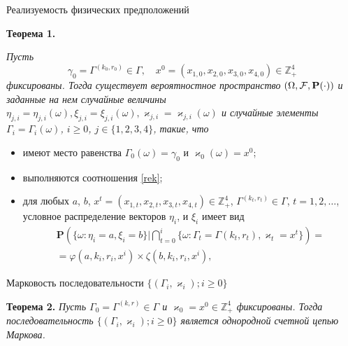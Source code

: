 \documentclass[10pt]{beamer}
\begin{document}
\begin{frame}{Реализуемость физических предположений}
  \begin{block}
    {\bf Теорема 1.} {\it 
    Пусть 
    $$\gamma_0=\Gamma^{(k_0,r_0)} \in \Gamma, \quad x^0=(x_{1,0},x_{2,0}, x_{3,0},x_{4,0})\in \mathbb{Z}_+^4$$ фиксированы. Тогда существует вероятностное пространство $(\Omega, {\cal F}, {\mathbf P}(\cdot))$ и заданные на нем случайные величины $\eta_{j,i}=\eta_{j,i}(\omega), \xi_{j,i}=\xi_{j,i}(\omega), \varkappa_{j,i}=\varkappa_{j,i}(\omega)$ и случайные элементы $\Gamma_i=\Gamma_i(\omega)$, $i\geqslant 0$, $j\in \{1, 2, 3, 4\}$, такие, что 
    \begin{itemize}
    \item имеют место равенства $\Gamma_0(\omega) = \gamma_0$ и $\varkappa_0(\omega)=x^0$;
    \item выполняются соотношения \eqref{rek};
    \item для любых  $a$, $b$, $x^t=(x_{1,t},x_{2,t},x_{3,t},x_{4,t}) \in \mathbb{Z}_+^4$, $\Gamma^{(k_t,r_t)} \in \Gamma$, $t = 1, 2, \ldots$, условное распределение векторов $\eta_i$, и $\xi_i$ имеет вид 
\begin{multline*}
    {\mathbf P}(\{ \omega \colon \eta_i = a, \xi_i=b\} |\bigcap_{t=0}^{i}\{\omega\colon \Gamma_t=\Gamma{(k_t,r_t)}, \varkappa_t=x^t\})=\\
=\varphi(a,k_i,r_i,x^i)\times \zeta(b,k_i,r_i,x^i),
\end{multline*}
    \end{itemize}
}
  \end{block}
\end{frame}

\begin{frame}{Марковость последовательности $\{(\Gamma_i, \varkappa_i); i \geqslant 0\}$}
\begin{block}
    {\bf Теорема 2.} {\it 
Пусть $\Gamma_0=\Gamma^{(k,r)}\in \Gamma$ и $\varkappa_0=x^0\in \mathbb{Z}_+^4$ фиксированы. Тогда последовательность $\{(\Gamma_i, \varkappa_i); i \geqslant 0\}$ является однородной счетной цепью Маркова.
}
\end{block}
\end{frame}
\end{document}

